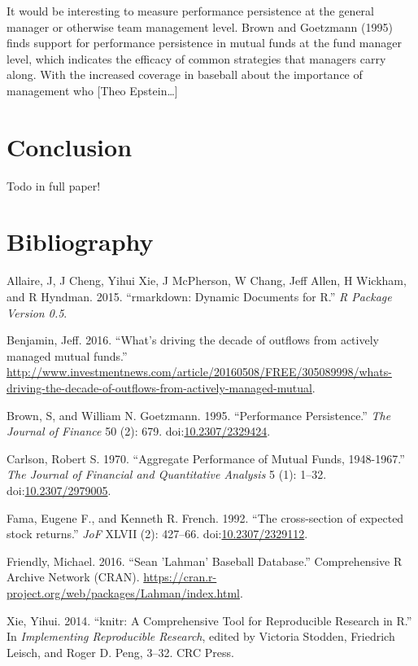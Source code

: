\documentclass[11pt,]{article}
\begin{document}
It would be interesting to measure performance persistence at the
general manager or otherwise team management level. Brown and Goetzmann
(1995) finds support for performance persistence in mutual funds at the
fund manager level, which indicates the efficacy of common strategies
that managers carry along. With the increased coverage in baseball about
the importance of management who {[}Theo Epstein\ldots{}{]}

\section{Conclusion}\label{conclusion}

Todo in full paper!

\newpage

\section*{Bibliography}\label{bibliography}

\hypertarget{refs}{}
\hypertarget{ref-allaire2015}{}
Allaire, J, J Cheng, Yihui Xie, J McPherson, W Chang, Jeff Allen, H
Wickham, and R Hyndman. 2015. ``rmarkdown: Dynamic Documents for R.''
\emph{R Package Version 0.5}.

\hypertarget{ref-Benjamin2016}{}
Benjamin, Jeff. 2016. ``What's driving the decade of outflows from
actively managed mutual funds.''
\url{http://www.investmentnews.com/article/20160508/FREE/305089998/whats-driving-the-decade-of-outflows-from-actively-managed-mutual}.

\hypertarget{ref-Brown1995}{}
Brown, S, and William N. Goetzmann. 1995. ``Performance Persistence.''
\emph{The Journal of Finance} 50 (2): 679.
doi:\href{https://doi.org/10.2307/2329424}{10.2307/2329424}.

\hypertarget{ref-Carlson1970}{}
Carlson, Robert S. 1970. ``Aggregate Performance of Mutual Funds,
1948-1967.'' \emph{The Journal of Financial and Quantitative Analysis} 5
(1): 1--32. doi:\href{https://doi.org/10.2307/2979005}{10.2307/2979005}.

\hypertarget{ref-FamaFrench1992}{}
Fama, Eugene F., and Kenneth R. French. 1992. ``The cross-section of
expected stock returns.'' \emph{JoF} XLVII (2): 427--66.
doi:\href{https://doi.org/10.2307/2329112}{10.2307/2329112}.

\hypertarget{ref-Friendly2016}{}
Friendly, Michael. 2016. ``Sean 'Lahman' Baseball Database.''
Comprehensive R Archive Network (CRAN).
\url{https://cran.r-project.org/web/packages/Lahman/index.html}.

\hypertarget{ref-Xie2014}{}
Xie, Yihui. 2014. ``knitr: A Comprehensive Tool for Reproducible
Research in R.'' In \emph{Implementing Reproducible Research}, edited by
Victoria Stodden, Friedrich Leisch, and Roger D. Peng, 3--32. CRC Press.

\newpage
\singlespacing 
\end{document}
